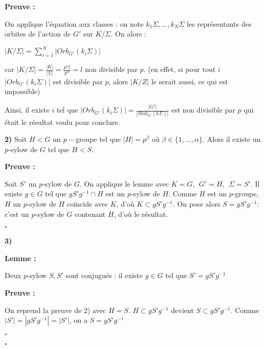 \documentclass{report}
\renewenvironment{leftbar}{%
  \def\FrameCommand{\vrule width 0.4pt \hspace{10pt}}%
  \MakeFramed {\advance\hsize-\width \FrameRestore}}%
 {\endMakeFramed}%
\newenvironment{preuve}{\vspace*{0.5cm}
    \begin{leftbar}
    \noindent\textbf{Preuve :}\par}{
    \begin{flushright}
    $\square$
    \end{flushright}
    \end{leftbar}
}
\newenvironment{lemme}[2][white]{\begin{tcolorbox}[colframe= #1]
    \textbf{Lemme :} #2  \par}
    {\end{tcolorbox}}
\begin{document}
\begin{preuve}
\begin{enumerate}
            On applique l'équation aux classes : on note $k_1 \Sigma , \dots , k_N\Sigma$ les représentants des orbites de l'action de $G'$ sur $K/ \Sigma $. On alors :
            
            \begin{center}
                $|K/\Sigma |= \displaystyle \sum _{i=1}^N|Orb_{G'}(k_i\Sigma )|$
            \end{center}
           
            car $|K/\Sigma | = \frac{|K|}{|\Sigma|}=\frac{p^\alpha l}{p^\alpha} = l$ non divisible par $p$. (en effet, si pour tout $i$ $|Orb_{G'}(k_i\Sigma)|$ est divisible par $p$, alors $|K/Z|$ le serait aussi, ce qui est impossible)
           
            \newline 
           
            Ainsi, il existe $i$ tel que $|Orb_{G'}(k_i\Sigma)| = \frac{|G'|}{|Stab_{G'}(k\Sigma)|} $ est non divisible par $p$ qui était le résultat voulu pour conclure. 
    
        \end{enumerate}
        
        
        \textbf{2)} Soit $H <G$ un $p-$groupe tel que $|H| = p^\beta $ où $\beta \in \{1, \dots , \alpha \}$. Alors il existe un $p$-sylow de $G$ tel que $H <S$.
        
        \begin{preuve}
            Soit $S'$ un $p$-sylow de $G$. On applique le lemme avec $ K =G, ~~ G' = H, ~~\Sigma =S'$. Il existe $g\in G$ tel que $gS'g^{-1}\cap H$ est un $p$-sylow de $H$. Comme $H$ est un $p$-groupe, $H$ un $p$-sylow de $H$ coïncide avec $K$, d'où $K \subset gS'g^{-1}$. 
            On pose alors $S =  gS'g^{-1} :$ c'est un $p$-sylow de $G$ contenant $H$, d'où le résultat.
        \end{preuve}    
        
        
        \textbf{3)}
        
        \begin{lemme}{}
            Deux $p$-sylow $S,S'$ sont conjugués : il existe $g\in G$ tel que $S'=gS'g^{-1}$
        \end{lemme}
        
        \begin{preuve}
            On reprend la preuve de 2) avec $H=S$. $H\subset gS'g^{-1}$ devient $S \subset gS'g^{-1}$. Comme $|S'| = |gS'g^{-1}|=|S'|$, on a $S=gS'g^{-1}$
        \end{preuve}
    

\end{preuve}
\end{document}
